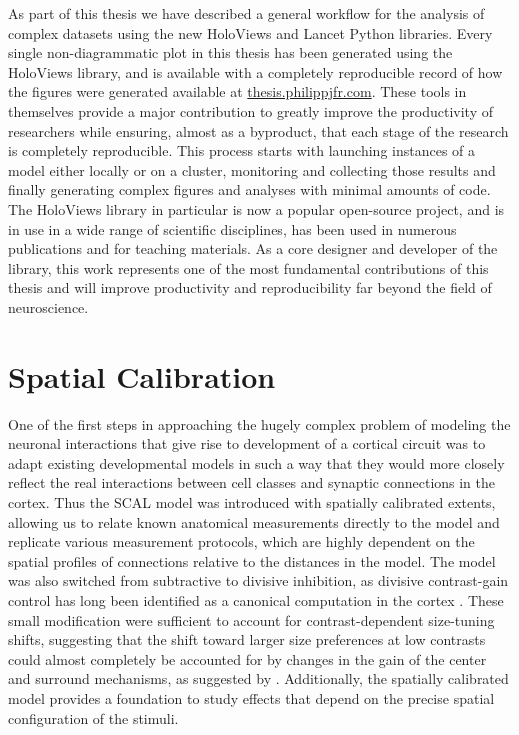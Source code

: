 As part of this thesis we have described a general workflow for the
analysis of complex datasets using the new HoloViews and Lancet Python
libraries. Every single non-diagrammatic plot in this thesis has been
generated using the HoloViews library, and is available with a
completely reproducible record of how the figures were generated
available at \url{thesis.philippjfr.com}. These tools in themselves
provide a major contribution to greatly improve the productivity of
researchers while ensuring, almost as a byproduct, that each stage of
the research is completely reproducible. This process starts with launching
instances of a model either locally or on a cluster, monitoring and
collecting those results and finally generating complex figures and
analyses with minimal amounts of code. The HoloViews library in
particular is now a popular open-source project, and is in use in a
wide range of scientific disciplines, has been used in numerous publications
and for teaching materials. As a core designer and developer of the
library, this work represents one of the most fundamental
contributions of this thesis and will improve productivity and
reproducibility far beyond the field of neuroscience.

\section{Spatial Calibration}

One of the first steps in approaching the hugely complex problem of
modeling the neuronal interactions that give rise to development of a
cortical circuit was to adapt existing developmental models in such a
way that they would more closely reflect the real interactions between
cell classes and synaptic connections in the cortex. Thus the
SCAL model was introduced with spatially calibrated extents, allowing
us to relate known anatomical measurements directly to the model and
replicate various measurement protocols, which are highly dependent
on the spatial profiles of connections relative to the distances in the
model. The model was also switched from subtractive to
divisive inhibition, as divisive contrast-gain control has long been
identified as a canonical computation in the cortex
\citep{Carandini2012}. These small modification were sufficient to
account for contrast-dependent size-tuning shifts, suggesting that the
shift toward larger size preferences at low contrasts could almost
completely be accounted for by changes in the gain of the center and
surround mechanisms, as suggested by \cite{Cavanaugh2002}. Additionally,
the spatially calibrated model provides a foundation to study effects
that depend on the precise spatial configuration of the stimuli.

